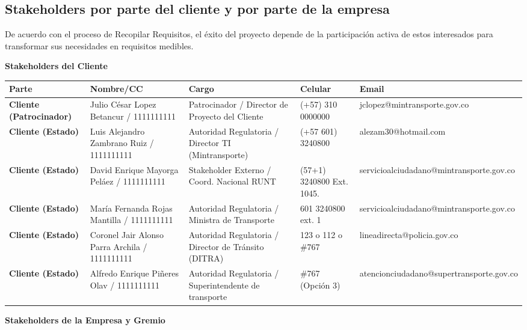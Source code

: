    \subsection{Stakeholders por parte del cliente y por parte de la empresa}
De acuerdo con el proceso de Recopilar Requisitos, el éxito del proyecto depende de la participación activa de estos interesados para transformar sus necesidades en requisitos medibles.

\textbf{Stakeholders del Cliente}

\begin{table}[H]
\footnotesize
\centering
\begin{tabulary}{\textwidth}{@{}LLLLL@{}}
\toprule
\textbf{Parte} & \textbf{Nombre/CC} & \textbf{Cargo} & \textbf{Celular} & \textbf{Email} \\ \midrule
\textbf{Cliente (Patrocinador)} & Julio César Lopez Betancur / 1111111111 & Patrocinador / Director de Proyecto del Cliente & (+57) 310 0000000 & jclopez@mintransporte.gov.co \\
\textbf{Cliente (Estado)} & Luis Alejandro Zambrano Ruiz / 1111111111 & Autoridad Regulatoria / Director TI (Mintransporte) & (+57 601) 3240800 & alezam30@hotmail.com \\
\textbf{Cliente (Estado)} & David Enrique Mayorga Peláez / 1111111111 & Stakeholder Externo / Coord. Nacional RUNT & (57+1) 3240800 Ext. 1045. & servicioalciudadano@mintransporte.gov.co \\
\textbf{Cliente (Estado)} & María Fernanda Rojas Mantilla / 1111111111 & Autoridad Regulatoria / Ministra de Transporte & 601 3240800 ext. 1 & servicioalciudadano@mintransporte.gov.co \\
\textbf{Cliente (Estado)} & Coronel Jair Alonso Parra Archila / 1111111111 & Autoridad Regulatoria / Director de Tránsito (DITRA) & 123 o 112 o \#767 & lineadirecta@policia.gov.co \\
\textbf{Cliente (Estado)} & Alfredo Enrique Piñeres Olav / 1111111111 & Autoridad Regulatoria / Superintendente de transporte & \#767 (Opción 3) & atencionciudadano@supertransporte.gov.co \\ \bottomrule
\end{tabulary}
\end{table}

\vspace{1em}

\textbf{Stakeholders de la Empresa y Gremio}

